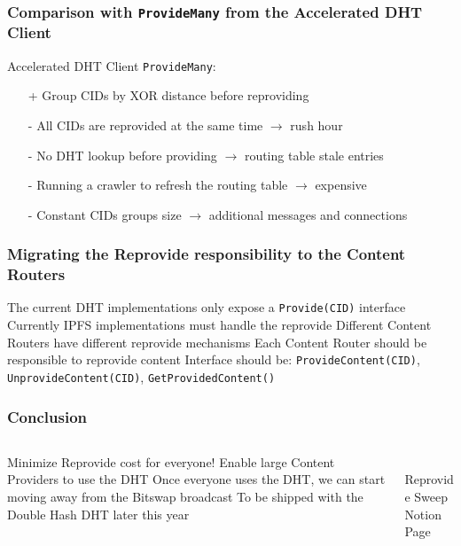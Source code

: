 \documentclass{../pl-slide}
\begin{document}
\begin{frame}
\frametitle{Comparison with \texttt{ProvideMany} from the Accelerated DHT Client}

Accelerated DHT Client \texttt{ProvideMany}:
\bigskip
\begin{itemize}
	\item[+] Group CIDs by XOR distance before reproviding
	\bigskip
	\item[-] All CIDs are reprovided at the same time $\xrightarrow{}$ rush hour
	\item[-] No DHT lookup before providing $\xrightarrow{}$ routing table stale entries
	\item[-] Running a crawler to refresh the routing table $\xrightarrow{}$ expensive
	\item[-] Constant CIDs groups size $\xrightarrow{}$ additional messages and connections
\end{itemize}
\end{frame}


\begin{frame}
\frametitle{Migrating the Reprovide responsibility to the Content Routers}

\begin{itemize}
	\itemc The current DHT implementations only expose a \texttt{Provide(CID)} interface
	\itemc Currently IPFS implementations must handle the reprovide
	\itemc Different Content Routers have different reprovide mechanisms
	\bigskip
	\itemc Each Content Router should be responsible to reprovide content
	\itemc Interface should be: \texttt{ProvideContent(CID)}, \texttt{UnprovideContent(CID)}, \texttt{GetProvidedContent()}
\end{itemize}
\end{frame}


\begin{frame}
\frametitle{Conclusion}
\begin{columns}[onlytextwidth]
\begin{column}{0.60\textwidth}
\begin{itemize}
	\itemc Minimize Reprovide cost for everyone!
	\itemc Enable large Content Providers to use the DHT
	\itemc Once everyone uses the DHT, we can start moving away from the Bitswap broadcast
   	\itemc To be shipped with the Double Hash DHT later this year
\end{itemize}
\end{column}
\begin{column}{0.38\textwidth}
\begin{center}
\\
\medskip
Reprovide Sweep Notion Page
\bigskip
\end{center}
\end{column}
\end{columns}

\end{frame}
\end{document}
